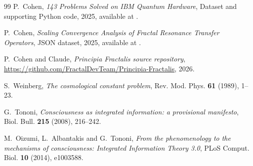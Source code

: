 \documentclass[11pt,a4paper]{article}
\theoremstyle{definition}
\theoremstyle{remark}
\begin{document}
\begin{thebibliography}{99}
P.~Cohen,
\emph{143 Problems Solved on IBM Quantum Hardware},
Dataset and supporting Python code, 2025, available at \cite{github_repo}.

P.~Cohen,
\emph{Scaling Convergence Analysis of Fractal Resonance Transfer Operators},
JSON dataset, 2025, available at \cite{github_repo}.

P.~Cohen and Claude,
\emph{Principia Fractalis source repository},
\url{https://github.com/FractalDevTeam/Principia-Fractalis}, 2026.

S.~Weinberg,
\emph{The cosmological constant problem},
Rev. Mod. Phys. \textbf{61} (1989), 1--23.

G.~Tononi,
\emph{Consciousness as integrated information: a provisional manifesto},
Biol. Bull. \textbf{215} (2008), 216--242.

M.~Oizumi, L.~Albantakis and G.~Tononi,
\emph{From the phenomenology to the mechanisms of consciousness:
Integrated Information Theory 3.0},
PLoS Comput. Biol. \textbf{10} (2014), e1003588.

\end{thebibliography}
\end{document}
